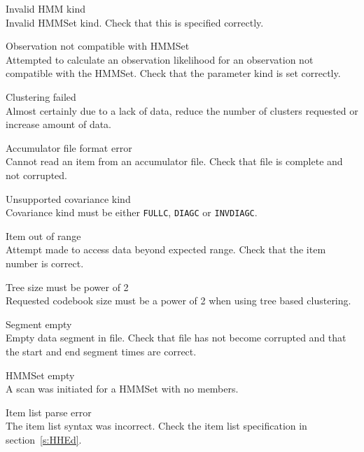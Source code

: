 \begin{itemize}
\begin{itemize}
    Invalid HMM kind\\
        Invalid HMMSet kind.  Check that this is specified correctly.

    Observation not compatible with HMMSet\\
        Attempted to calculate an observation likelihood for an observation
        not compatible with the HMMSet.  Check that the parameter kind is
        set correctly.

\end{itemize}


\begin{itemize}
    Clustering failed\\
        Almost certainly due to a lack of data, reduce the
        number of clusters requested  or increase amount of data.

    Accumulator file format error\\
        Cannot read an item from an accumulator file. Check
        that file is complete and not corrupted.

    Unsupported covariance kind\\
        Covariance kind must be either \texttt{FULLC}, \texttt{DIAGC} or 
        \texttt{INVDIAGC}.

    Item out of range\\
        Attempt made to access data beyond expected range. Check that 
        the item number is correct.

    Tree size must be power of 2\\
        Requested codebook size must be a power of 2 when
        using tree based clustering.

    Segment empty\\
        Empty data segment in file. Check that file has not
        become corrupted and that the start and end segment times
        are correct.

\end{itemize}


\begin{itemize}
    HMMSet empty\\
        A scan was initiated for a HMMSet with no members.

    Item list parse error\\
        The item list syntax was incorrect.  Check the item list specification
        in section~\ref{s:HHEd}.


\end{itemize}
\end{itemize}
